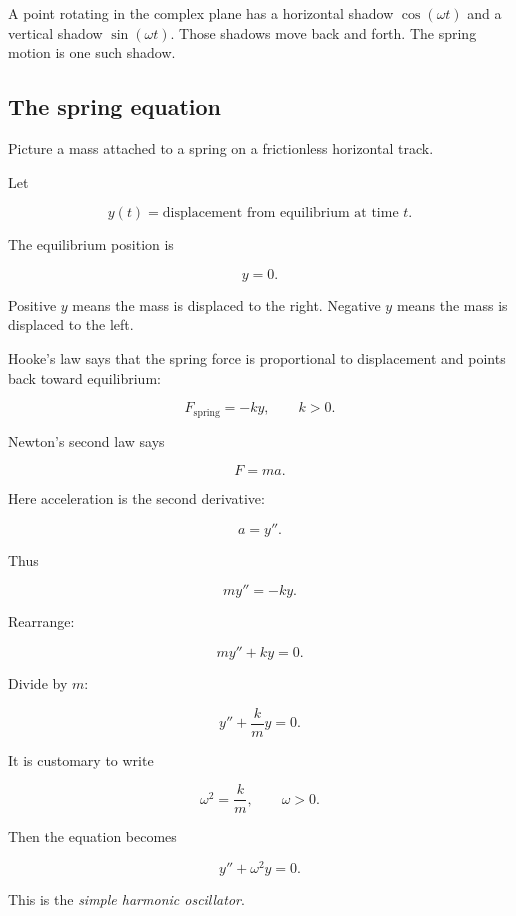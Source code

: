 A point rotating in the complex plane has a horizontal shadow \(\cos(\omega t)\) and a
vertical shadow \(\sin(\omega t)\).  Those shadows move back and forth.  The spring
motion is one such shadow.

\subsection{The spring equation}
\label{subsec:spring-equation-ch17}

Picture a mass attached to a spring on a frictionless horizontal track.

Let

\[
y(t)=\text{displacement from equilibrium at time }t.
\]

The equilibrium position is

\[
y=0.
\]

Positive \(y\) means the mass is displaced to the right.  Negative \(y\) means the mass
is displaced to the left.

Hooke's law says that the spring force is proportional to displacement and points back
toward equilibrium:

\[
F_{\text{spring}}=-ky,
\qquad k>0.
\]

Newton's second law says

\[
F=ma.
\]

Here acceleration is the second derivative:

\[
a=y''.
\]

Thus

\[
my''=-ky.
\]

Rearrange:

\[
my''+ky=0.
\]

Divide by \(m\):

\[
y''+\frac{k}{m}y=0.
\]

It is customary to write

\[
\omega^2=\frac{k}{m},
\qquad \omega>0.
\]

Then the equation becomes

\[
\boxed{
y''+\omega^2y=0.
}
\]

This is the \emph{simple harmonic oscillator}.

